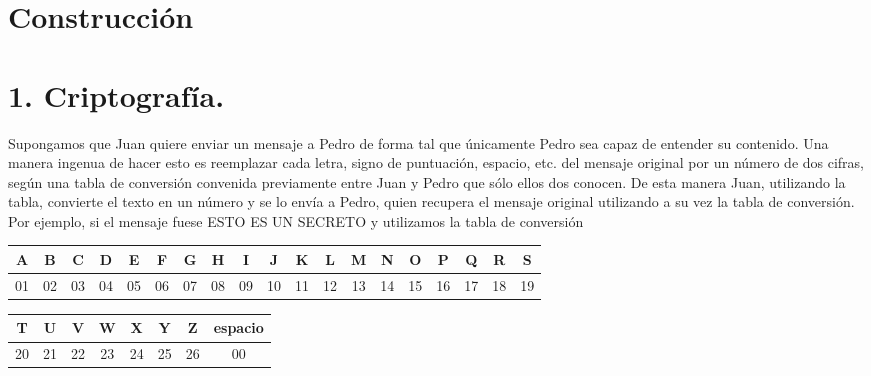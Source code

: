 \documentclass[10pt]{article}
\begin{document}
\section*{Construcción}
\section*{1. Criptografía.}
Supongamos que Juan quiere enviar un mensaje a Pedro de forma tal que únicamente Pedro sea capaz de entender su contenido. Una manera ingenua de hacer esto es reemplazar cada letra, signo de puntuación, espacio, etc. del mensaje original por un número de dos cifras, según una tabla de conversión convenida previamente entre Juan y Pedro que sólo ellos dos conocen. De esta manera Juan, utilizando la tabla, convierte el texto en un número y se lo envía a Pedro, quien recupera el mensaje original utilizando a su vez la tabla de conversión.\\
Por ejemplo, si el mensaje fuese ESTO ES UN SECRETO y utilizamos la tabla de conversión

\begin{center}
\begin{tabular}{|c|c|c|c|c|c|c|c|c|c|c|c|c|c|c|c|c|c|c|}
\hline
A & B & C & D & E & F & G & H & I & J & K & L & M & N & O & P & Q & R & S \\
\hline
01 & 02 & 03 & 04 & 05 & 06 & 07 & 08 & 09 & 10 & 11 & 12 & 13 & 14 & 15 & 16 & 17 & 18 & 19 \\
\hline
\end{tabular}
\end{center}

\begin{center}
\begin{tabular}{|c|c|c|c|c|c|c|c|}
\hline
T & U & V & W & X & Y & Z & espacio \\
\hline
20 & 21 & 22 & 23 & 24 & 25 & 26 & 00 \\
\hline
\end{tabular}
\end{center}
\end{document}
